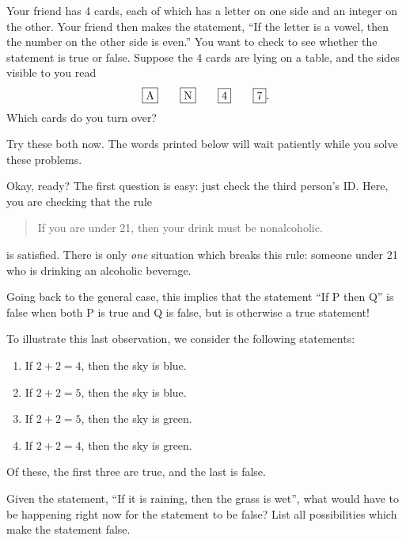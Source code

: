 \documentclass{tufte-book}
\begin{document}
\begin{example}
  Your friend has 4 cards, each of which has a letter on one side and an integer on the other. Your friend then makes the statement, ``If the letter is a vowel, then the number on the other side is even.'' You want to check to see whether the statement is true or false. Suppose the 4 cards are lying on a table, and the sides visible to you read
  \[
  \framebox{A} \qquad \framebox{N} \qquad \framebox{4} \qquad \framebox{7}.
  \]
  Which cards do you turn over? 
\end{example}

Try these both now. The words printed below will wait patiently while you solve these problems.

\begin{center}
{\Large\Clocklogo}
\end{center}

Okay, ready? The first question is easy: just check the third person's ID. Here, you are checking that the rule
\begin{quote}
  If you are under 21, then your drink must be nonalcoholic.
\end{quote}
is satisfied. There is only \emph{one} situation which breaks this rule: someone under 21 who is drinking an alcoholic beverage. 

Going back to the general case, this implies that the statement ``If P then Q'' is false when both P is true and Q is false, but is otherwise a true statement!

To illustrate this last observation, we consider the following statements:
\begin{enumerate}
    \item If $2 + 2 = 4$, then the sky is blue.
    \item If $2 + 2 = 5$, then the sky is blue.
    \item If $2 + 2 = 5$, then the sky is green.
    \item If $2 + 2 = 4$, then the sky is green.
\end{enumerate}
Of these, the first three are true, and the last is false.
\begin{example}
  Given the statement, ``If it is raining, then the grass is wet'', what would have to be happening right now for the statement to be false? List all possibilities which make the statement false.
\end{example}
\end{document}
